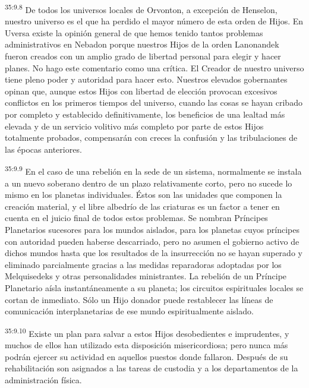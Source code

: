 \par
\textsuperscript{35:9.8} De todos los universos locales de Orvonton, a excepción de Henselon, nuestro universo es el que ha perdido el mayor número de esta orden de Hijos. En Uversa existe la opinión general de que hemos tenido tantos problemas administrativos en Nebadon porque nuestros Hijos de la orden Lanonandek fueron creados con un amplio grado de libertad personal para elegir y hacer planes. No hago este comentario como una crítica. El Creador de nuestro universo tiene pleno poder y autoridad para hacer esto. Nuestros elevados gobernantes opinan que, aunque estos Hijos con libertad de elección provocan excesivos conflictos en los primeros tiempos del universo, cuando las cosas se hayan cribado por completo y establecido definitivamente, los beneficios de una lealtad más elevada y de un servicio volitivo más completo por parte de estos Hijos totalmente probados, compensarán con creces la confusión y las tribulaciones de las épocas anteriores.

\par
\textsuperscript{35:9.9} En el caso de una rebelión en la sede de un sistema, normalmente se instala a un nuevo soberano dentro de un plazo relativamente corto, pero no sucede lo mismo en los planetas individuales. Éstos son las unidades que componen la creación material, y el libre albedrío de las criaturas es un factor a tener en cuenta en el juicio final de todos estos problemas. Se nombran Príncipes Planetarios sucesores para los mundos aislados, para los planetas cuyos príncipes con autoridad pueden haberse descarriado, pero no asumen el gobierno activo de dichos mundos hasta que los resultados de la insurrección no se hayan superado y eliminado parcialmente gracias a las medidas reparadoras adoptadas por los Melquisedeks y otras personalidades ministrantes. La rebelión de un Príncipe Planetario aísla instantáneamente a su planeta; los circuitos espirituales locales se cortan de inmediato. Sólo un Hijo donador puede restablecer las líneas de comunicación interplanetarias de ese mundo espiritualmente aislado.

\par
\textsuperscript{35:9.10} Existe un plan para salvar a estos Hijos desobedientes e imprudentes, y muchos de ellos han utilizado esta disposición misericordiosa; pero nunca más podrán ejercer su actividad en aquellos puestos donde fallaron. Después de su rehabilitación son asignados a las tareas de custodia y a los departamentos de la administración física.

